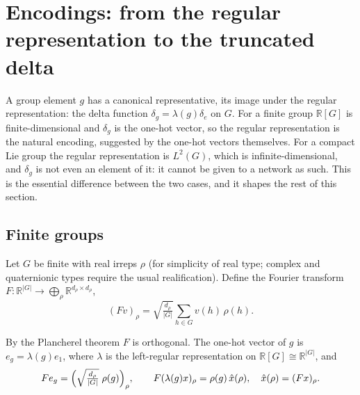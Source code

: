\documentclass[a4paper,11pt]{article}
\theoremstyle{remark}
\theoremstyle{definition}
\newcommand{\R}{\mathbb{R}}
\begin{document}
\section{Encodings: from the regular representation to the truncated delta}
\label{sec:encodings}

A group element $g$ has a canonical representative, its image under the regular
representation: the delta function $\delta_g=\lambda(g)\delta_e$ on $G$. For a
finite group $\R[G]$ is finite-dimensional and $\delta_g$ is the one-hot vector, so
the regular representation is the natural encoding, suggested by the one-hot
vectors themselves. For a compact Lie group the regular representation is
$L^2(G)$, which is infinite-dimensional, and $\delta_g$ is not even an element of it:
it cannot be given to a network as such. This is the essential difference between
the two cases, and it shapes the rest of this section.

\subsection{Finite groups}\label{sec:finite}

Let $G$ be finite with real irreps $\rho$ (for simplicity of real type;
complex and quaternionic types require the usual realification). Define the
Fourier transform $F:\R^{|G|}\to\bigoplus_\rho\R^{d_\rho\times d_\rho}$,
\begin{equation}
(Fv)_\rho=\sqrt{\tfrac{d_\rho}{|G|}}\sum_{h\in G}v(h)\,\rho(h).
\end{equation}

By the Plancherel theorem $F$ is orthogonal. The one-hot vector of $g$ is
$e_g=\lambda(g)e_1$, where $\lambda$ is the left-regular representation on
$\R[G]\cong\R^{|G|}$, and
\begin{equation}\label{eq:onehot}
Fe_g=\Bigl(\sqrt{\tfrac{d_\rho}{|G|}}\;\rho(g)\Bigr)_{\rho},\qquad
F(\lambda(g)x)_\rho=\rho(g)\,\hat x(\rho),\quad \hat x(\rho)=(Fx)_\rho .
\end{equation}
\end{document}
